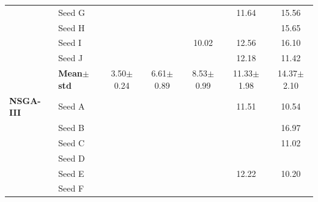\begin{table}[H]
{\begin{tabular}{@{}llccccc@{}}
 & Seed G & \cellcolor{RoyalBlue!10}{\small 3.76} & \cellcolor{RoyalBlue!10}{\small 6.69} & \cellcolor{RoyalBlue!10}{\small 8.40} & {\small\color{gray!60!black}11.64} & {\small\color{gray!60!black}15.56} \\
 & Seed H & \cellcolor{RoyalBlue!10}{\small 3.70} & \cellcolor{RoyalBlue!10}{\small 6.65} & \cellcolor{RoyalBlue!10}{\small 8.97} & \cellcolor{RoyalBlue!10}{\small 7.41} & {\small\color{gray!60!black}15.65} \\
 & Seed I & \cellcolor{RoyalBlue!10}{\small 3.28} & \cellcolor{RoyalBlue!10}{\small 8.12} & {\small\color{gray!60!black}10.02} & {\small\color{gray!60!black}12.56} & {\small\color{gray!60!black}16.10} \\
 & Seed J & \cellcolor{RoyalBlue!10}{\small 3.55} & \cellcolor{RoyalBlue!10}{\small 6.45} & \cellcolor{RoyalBlue!10}{\small 8.43} & {\small\color{gray!60!black}12.18} & {\small\color{gray!60!black}11.42} \\
 & \textbf{Mean$\pm$std} & \cellcolor{RoyalBlue!20}3.50$\pm$0.24 & \cellcolor{RoyalBlue!20}6.61$\pm$0.89 & \cellcolor{RoyalBlue!20}8.53$\pm$0.99 & \cellcolor{red!12}11.33$\pm$1.98 & \cellcolor{red!12}14.37$\pm$2.10 \\
\midrule
\textbf{NSGA-III} & Seed A & \cellcolor{RoyalBlue!10}{\small 2.19} & \cellcolor{RoyalBlue!10}{\small 5.72} & \cellcolor{RoyalBlue!10}{\small 8.78} & {\small\color{gray!60!black}11.51} & {\small\color{gray!60!black}10.54} \\
 & Seed B & \cellcolor{RoyalBlue!10}{\small 2.44} & \cellcolor{RoyalBlue!10}{\small 5.35} & \cellcolor{RoyalBlue!10}{\small 6.42} & \cellcolor{RoyalBlue!10}{\small 9.71} & {\small\color{gray!60!black}16.97} \\
 & Seed C & \cellcolor{RoyalBlue!10}{\small 2.82} & \cellcolor{RoyalBlue!10}{\small 5.42} & \cellcolor{RoyalBlue!10}{\small 5.38} & \cellcolor{RoyalBlue!10}{\small 7.69} & {\small\color{gray!60!black}11.02} \\
 & Seed D & \cellcolor{RoyalBlue!10}{\small 3.09} & \cellcolor{RoyalBlue!10}{\small 4.86} & \cellcolor{RoyalBlue!10}{\small 5.84} & \cellcolor{RoyalBlue!10}{\small 7.98} & \cellcolor{RoyalBlue!10}{\small 9.61} \\
 & Seed E & \cellcolor{RoyalBlue!10}{\small 2.65} & \cellcolor{RoyalBlue!10}{\small 4.37} & \cellcolor{RoyalBlue!10}{\small 6.34} & {\small\color{gray!60!black}12.22} & {\small\color{gray!60!black}10.20} \\
 & Seed F & \cellcolor{RoyalBlue!10}{\small 2.50} & \cellcolor{RoyalBlue!10}{\small 5.50} & \cellcolor{RoyalBlue!10}{\small 9.10} & \cellcolor{RoyalBlue!10}{\small 8.80} & \cellcolor{RoyalBlue!10}{\small 8.56} \\

\end{tabular}}
\end{table}
